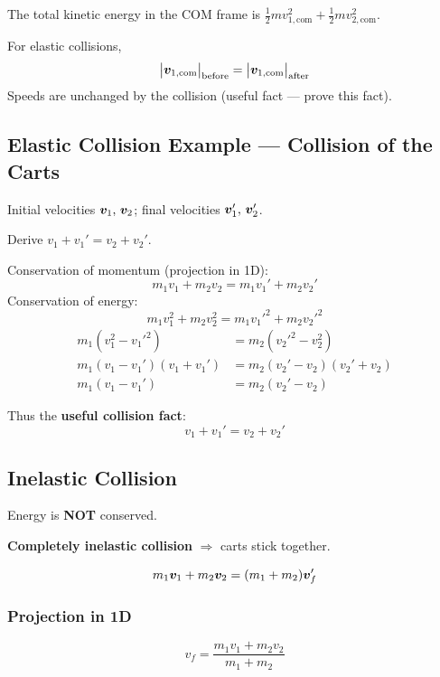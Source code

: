 The total kinetic energy in the COM frame is $\tfrac{1}{2}m v_{1,\text{com}}^2 + \tfrac{1}{2}m v_{2,\text{com}}^2$.

\begin{fact}
For elastic collisions,
\[
    \bigl|\bm{v}_{1,\text{com}}\bigr|_{\text{before}}
    = \bigl|\bm{v}_{1,\text{com}}\bigr|_{\text{after}}
\]
Speeds are unchanged by the collision (useful fact — prove this fact).
\end{fact}

\subsection{Elastic Collision Example — Collision of the Carts}

\begin{example}
Initial velocities $\bm{v}_1,\,\bm{v}_2$; final velocities $\bm{v}_1',\,\bm{v}_2'$.

Derive $v_1 + v_1' = v_2 + v_2'$.

Conservation of momentum (projection in 1D):
\[
    m_1 v_1 + m_2 v_2 = m_1 v_1' + m_2 v_2'
\]
Conservation of energy:
\[
    m_1 v_1^2 + m_2 v_2^2 = m_1 {v_1'}^2 + m_2 {v_2'}^2
\]
\begin{align*}
    m_1(v_1^2-{v_1'}^2) &= m_2({v_2'}^2-v_2^2) \\
    m_1(v_1-v_1')(v_1+v_1') &= m_2(v_2'-v_2)(v_2'+v_2) \\
    m_1(v_1-v_1') &= m_2(v_2'-v_2)
\end{align*}

Thus the \textbf{useful collision fact}:
\[
    \boxed{v_1 + v_1' = v_2 + v_2'}
\]
\end{example}

\subsection{Inelastic Collision}

Energy is \textbf{NOT} conserved.

\textbf{Completely inelastic collision} $\Rightarrow$ carts stick together.

\[
    m_1\bm{v}_1 + m_2\bm{v}_2 = (m_1+m_2)\bm{v}_f'
\]

\subsubsection*{Projection in 1D}
\[
    v_f = \frac{m_1 v_1 + m_2 v_2}{m_1 + m_2}
\]

